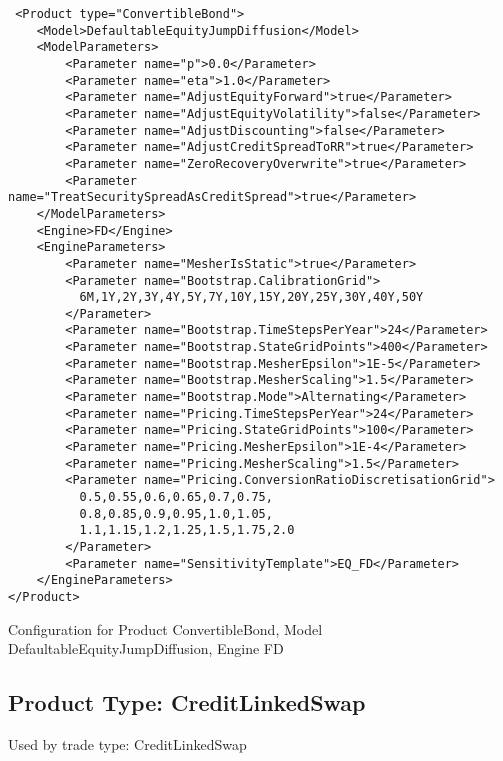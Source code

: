 \begin{longlisting}
\begin{verbatim}
 <Product type="ConvertibleBond">
    <Model>DefaultableEquityJumpDiffusion</Model>
    <ModelParameters>
        <Parameter name="p">0.0</Parameter>
        <Parameter name="eta">1.0</Parameter>
        <Parameter name="AdjustEquityForward">true</Parameter>
        <Parameter name="AdjustEquityVolatility">false</Parameter>
        <Parameter name="AdjustDiscounting">false</Parameter>
        <Parameter name="AdjustCreditSpreadToRR">true</Parameter>
        <Parameter name="ZeroRecoveryOverwrite">true</Parameter>
        <Parameter name="TreatSecuritySpreadAsCreditSpread">true</Parameter>
    </ModelParameters>
    <Engine>FD</Engine>
    <EngineParameters>
        <Parameter name="MesherIsStatic">true</Parameter>
        <Parameter name="Bootstrap.CalibrationGrid">
          6M,1Y,2Y,3Y,4Y,5Y,7Y,10Y,15Y,20Y,25Y,30Y,40Y,50Y
        </Parameter>
        <Parameter name="Bootstrap.TimeStepsPerYear">24</Parameter>
        <Parameter name="Bootstrap.StateGridPoints">400</Parameter>
        <Parameter name="Bootstrap.MesherEpsilon">1E-5</Parameter>
        <Parameter name="Bootstrap.MesherScaling">1.5</Parameter>
        <Parameter name="Bootstrap.Mode">Alternating</Parameter>
        <Parameter name="Pricing.TimeStepsPerYear">24</Parameter>
        <Parameter name="Pricing.StateGridPoints">100</Parameter>
        <Parameter name="Pricing.MesherEpsilon">1E-4</Parameter>
        <Parameter name="Pricing.MesherScaling">1.5</Parameter>
        <Parameter name="Pricing.ConversionRatioDiscretisationGrid">
          0.5,0.55,0.6,0.65,0.7,0.75,
          0.8,0.85,0.9,0.95,1.0,1.05,
          1.1,1.15,1.2,1.25,1.5,1.75,2.0
        </Parameter>
        <Parameter name="SensitivityTemplate">EQ_FD</Parameter>
    </EngineParameters>
</Product>
\end{verbatim}
\caption{Configuration for Product ConvertibleBond, Model DefaultableEquityJumpDiffusion, Engine FD}
\label{lst:peconfig_ConvertibleBond_DefaultableEquityJumpDiffusion_FD}
\end{longlisting}

\subsection{Product Type: CreditLinkedSwap}

Used by trade type: CreditLinkedSwap

